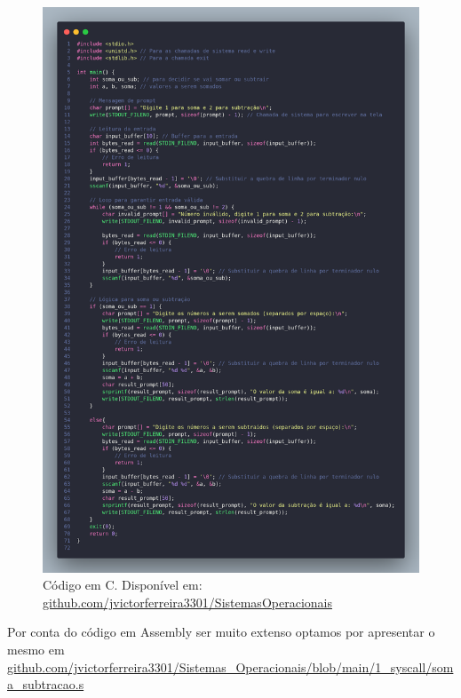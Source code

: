 \documentclass[
	12pt,				%
	openright,			%
	oneside,			%
	a4paper,			%
	chapter=TITLE,		%
	english,			%
	french,				%
	spanish,			%
	brazil				%
	]{abntex2}
\theoremstyle{definition}
\begin{document}
\begin{figure}
	\centering
	\begin{minipage}{1.0\textwidth}
	  \includegraphics[width=1.0\linewidth]{imagens/code_c.png}
	  \caption{Código em C. Disponível em: \href{https://github.com/jvictorferreira3301/Sistemas_Operacionais}{github.com/jvictorferreira3301/SistemasOperacionais}}
	\end{minipage}
\end{figure}

Por conta do código em Assembly ser muito extenso optamos por apresentar o mesmo em \href{https://github.com/jvictorferreira3301/Sistemas_Operacionais/blob/main/1_syscall/soma_subtracao.s}
{github.com/jvictorferreira3301/Sistemas\_Operacionais/blob/main/1\_syscall/soma\_subtracao.s}
\end{document}
